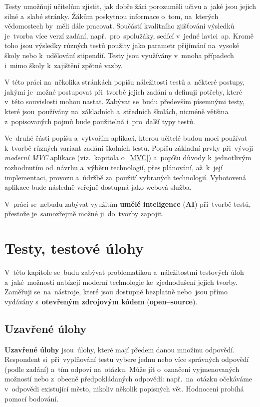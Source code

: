 \documentclass[11pt,a4paper]{report}
\begin{document}
        Testy umožňují učitelům zjistit, jak dobře žáci porozuměli učivu a~jaké jsou jejich silné a~slabé stránky. Žákům poskytnou informace o~tom, na~kterých vědomostech by~měli dále pracovat. Součástí kvalitního zjišťování výsledků je~tvorba více verzí zadání, např.~pro~spolužáky, sedící v~jedné lavici~ap. Kromě toho jsou výsledky různých testů použity jako parametr přijímání na~vysoké školy nebo k~udělování stipendií. Testy jsou využívány v~mnoha případech i~mimo školy k~zajištění zpětné vazby.
        
        V této práci na~několika stránkách popíšu náležitosti testů a~některé postupy, jakými je~možné postupovat při~tvorbě jejich zadání a definuji potřeby, které v~této souvislosti mohou nastat. Zabývat se~budu především písemnými testy, které jsou~používány na~základních a~středních školách, nicméně většina z~popisovaných pojmů bude použitelná i~pro~další typy testů.
        
        Ve~druhé části popíšu a~vytvořím aplikaci, kterou učitelé budou moci používat k~tvorbě různých variant zadání školních testů. Popíšu základní prvky při~vývoji \emph{moderní \emph{MVC}} aplikace (viz.~kapitola o~\ref{MVC}) a~popíšu důvody k~jednotlivým rozhodnutím od~návrhu a~výběru technologií, přes plánování, až~k~její implementaci, provozu a~údržbě za~použití vybraných technologií. Vyhotovená aplikace bude následně veřejně dostupná jako webová služba.

        V~práci se~nebudu zabývat využitím \textbf{umělé inteligence} (\textbf{AI}) při~tvorbě testů, přestože je~samozřejmě možné ji~do~tvorby zapojit.

    \chapter{Testy, testové úlohy}
         V~této kapitole se~budu zabývat problematikou a~náležitostmi testových úloh a~jaké~možnosti nabízejí moderní technologie ke~zjednodušení jejich tvorby. Zaměřuji se~na~nástroje, které jsou dostupné bezplatně nebo~jsou přímo vydávány s~\textbf{otevřeným zdrojovým kódem} (\textbf{open--source}).

        \section{Uzavřené úlohy}
            \textbf{Uzavřené úlohy} jsou~úlohy, které mají předem danou množinu odpovědí. Respondent si~při~vyplňování testu vybere jednu nebo více správných odpovědí (podle zadání) a~tím odpoví na~otázku. Může jít o~označení vyjmenovaných možností nebo z~obecně předpokládaných odpovědí: např.~na~otázku  očekáváme v~odpovědi existující město, nikoliv několik popisných vět. Hodnocení probíhá pomocí bodování.
\end{document}
